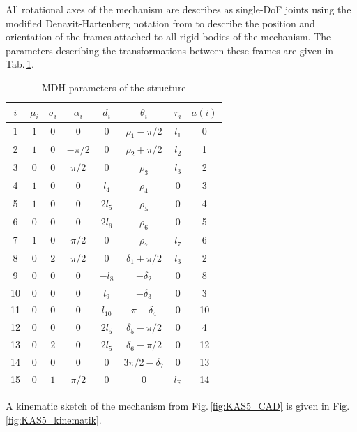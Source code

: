 \documentclass[letterpaper, 10 pt, conference]{ieeeconf}  %
\begin{document}
All rotational axes of the mechanism are describes as single-DoF joints using the modified Denavit-Hartenberg notation from \cite{KhalilKle1986} to describe the position and orientation of the frames attached to all rigid bodies of the mechanism.
The parameters describing the transformations between these frames are given in Tab.\,\ref{tab:mdh_parameter}.
%
\begin{table}
    \begin{tabular}[t]{|c||c|c||c|c|c|c|c|}
        \hline
        $i$ & $\mu_i$ & $\sigma_i$ & $\alpha_i$ & $d_i$ & $\theta_i$ & $r_i$ & $a(i)$ \\
        \hline
        1 & $1$ & $0$ & $0$ & $0$ & $\rho_1-\pi/2$ & $l_1$ & 0 \\
        2 & $1$ & $0$ & $-\pi/2$ & $0$ & $\rho_2+\pi/2$ & $l_2$ & 1 \\
        3 & $0$ & $0$ & $\pi/2$ & $0$ & $\rho_3$ & $l_3$ & 2 \\
        4 & $1$ & $0$ & $0$ & $l_4$ & $\rho_4$ & $0$ & 3 \\
        5 & $1$ & $0$ & $0$ & $2l_{5}$ & $\rho_5$ & $0$ & 4 \\
        6 & $0$ & $0$ & $0$ & $2l_{6}$ & $\rho_6$ & $0$ & 5 \\
        7 & $1$ & $0$ & $\pi/2$ & $0$ & $\rho_7$ & $l_{7}$ & 6 \\
        8 & $0$ & $2$ & $\pi/2$ & $0$ & $\delta_{1}+\pi/2$ & $l_{3}$ & 2 \\
        9 & $0$ & $0$ & $0$ & $-l_{8}$ & $-\delta_{2}$ & $0$ & 8 \\
        10 & $0$ & $0$ & $0$ & $l_{9}$ & $-\delta_{3}$ & $0$ & 3 \\
        11 & $0$ & $0$ & $0$ & $l_{10}$ & $\pi-\delta_{4}$ & $0$ & 10 \\
        12 & $0$ & $0$ & $0$ & $2l_{5}$ & $\delta_{5}-\pi/2$ & $0$ & 4 \\
        13 & $0$ & $2$ & $0$ & $2l_{5}$ & $\delta_{6}-\pi/2$ & $0$ & 12 \\
        14 & $0$ & $0$ & $0$ & $0$ & $3\pi/2-\delta_{7}$ & $0$ & 13 \\
        15 & $0$ & $1$ & $\pi/2$ & $0$ & $0$ & $l_{\mathrm{F}}$ & 14 \\
        \hline
    \end{tabular}
    \label{tab:mdh_parameter}
    \caption{MDH parameters of the structure}
\end{table}
%
A kinematic sketch of the mechanism from Fig.\,\ref{fig:KAS5_CAD} is given in Fig.\,\ref{fig:KAS5_kinematik}.
\end{document}
